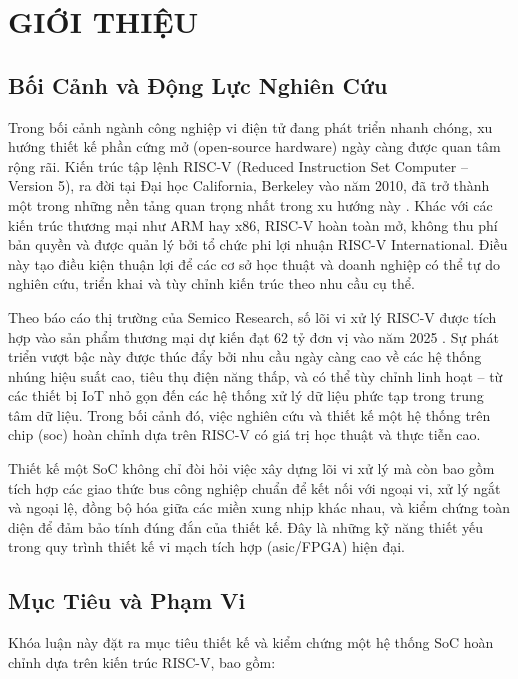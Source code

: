 \chapter{GIỚI THIỆU}
\label{Chapter1}

\section{Bối Cảnh và Động Lực Nghiên Cứu}

Trong bối cảnh ngành công nghiệp vi điện tử đang phát triển nhanh chóng, xu hướng thiết kế phần cứng mở (open-source hardware) ngày càng được quan tâm rộng rãi. Kiến trúc tập lệnh RISC-V (Reduced Instruction Set Computer -- Version 5), ra đời tại Đại học California, Berkeley vào năm 2010, đã trở thành một trong những nền tảng quan trọng nhất trong xu hướng này \cite{riscv-spec}. Khác với các kiến trúc thương mại như ARM hay x86, RISC-V hoàn toàn mở, không thu phí bản quyền và được quản lý bởi tổ chức phi lợi nhuận RISC-V International. Điều này tạo điều kiện thuận lợi để các cơ sở học thuật và doanh nghiệp có thể tự do nghiên cứu, triển khai và tùy chỉnh kiến trúc theo nhu cầu cụ thể.

Theo báo cáo thị trường của Semico Research, số lõi vi xử lý RISC-V được tích hợp vào sản phẩm thương mại dự kiến đạt 62 tỷ đơn vị vào năm 2025 \cite{semico-riscv-growth}. Sự phát triển vượt bậc này được thúc đẩy bởi nhu cầu ngày càng cao về các hệ thống nhúng hiệu suất cao, tiêu thụ điện năng thấp, và có thể tùy chỉnh linh hoạt -- từ các thiết bị IoT nhỏ gọn đến các hệ thống xử lý dữ liệu phức tạp trong trung tâm dữ liệu. Trong bối cảnh đó, việc nghiên cứu và thiết kế một hệ thống trên chip (\acrfull{soc}) hoàn chỉnh dựa trên RISC-V có giá trị học thuật và thực tiễn cao.

Thiết kế một SoC không chỉ đòi hỏi việc xây dựng lõi vi xử lý mà còn bao gồm tích hợp các giao thức bus công nghiệp chuẩn để kết nối với ngoại vi, xử lý ngắt và ngoại lệ, đồng bộ hóa giữa các miền xung nhịp khác nhau, và kiểm chứng toàn diện để đảm bảo tính đúng đắn của thiết kế. Đây là những kỹ năng thiết yếu trong quy trình thiết kế vi mạch tích hợp (\acrshort{asic}/FPGA) hiện đại.

\section{Mục Tiêu và Phạm Vi}

Khóa luận này đặt ra mục tiêu thiết kế và kiểm chứng một hệ thống SoC hoàn chỉnh dựa trên kiến trúc RISC-V, bao gồm:

